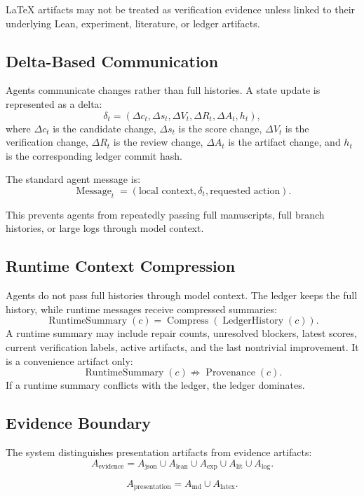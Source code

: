 \documentclass[11pt]{article}
\begin{document}
LaTeX artifacts may not be treated as verification evidence unless linked to their underlying Lean, experiment, literature, or ledger artifacts.

\subsection{Delta-Based Communication}

Agents communicate changes rather than full histories. A state update is represented as a delta:
$$
\delta_t = ( \Delta c_t, \Delta s_t, \Delta V_t, \Delta R_t, \Delta A_t, h_t ),
$$
where $\Delta c_t$ is the candidate change, $\Delta s_t$ is the score change, $\Delta V_t$ is the verification change, $\Delta R_t$ is the review change, $\Delta A_t$ is the artifact change, and $h_t$ is the corresponding ledger commit hash.

The standard agent message is:
$$
\operatorname{Message}_t = ( \text{local context}, \delta_t, \text{requested action} ).
$$

This prevents agents from repeatedly passing full manuscripts, full branch histories, or large logs through model context.


\subsection{Runtime Context Compression}

Agents do not pass full histories through model context. The ledger keeps the full history, while runtime messages receive compressed summaries:
$$
\operatorname{RuntimeSummary}(c)=\operatorname{Compress}(\operatorname{LedgerHistory}(c)).
$$
A runtime summary may include repair counts, unresolved blockers, latest scores, current verification labels, active artifacts, and the last nontrivial improvement. It is a convenience artifact only:
$$
\operatorname{RuntimeSummary}(c)\not\Rightarrow\operatorname{Provenance}(c).
$$
If a runtime summary conflicts with the ledger, the ledger dominates.


\subsection{Evidence Boundary}

The system distinguishes presentation artifacts from evidence artifacts:
$$
A_{\text{evidence}} = A_{\text{json}} \cup A_{\text{lean}} \cup A_{\text{exp}} \cup A_{\text{lit}} \cup A_{\text{log}}.
$$

$$
A_{\text{presentation}} = A_{\text{md}} \cup A_{\text{latex}}.
$$
\end{document}
